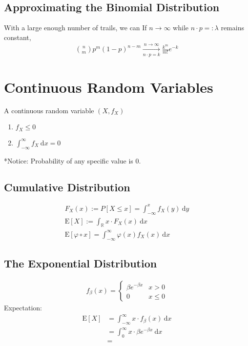 \documentclass[11pt,a4paper]{article}
\newcommand{\dd}{\mathrm{d}}
\newcommand{\dx}{\dd x}
\newcommand{\dy}{\dd y}
\begin{document}
\subsection{Approximating the Binomial Distribution}
With a large enough number of trails, we can
If $n\rightarrow\infty$ while $n\cdot p=:\lambda$ remains constant,
\begin{gather}
    \binom{n}{m}
    p^m(1-p)^{n-m}     \xrightarrow[n\cdot p =k]{n\rightarrow \infty} \frac{k^m}{m!}e^{-k}
\end{gather}

\section{Continuous Random Variables}
A continuous random variable $(X,f_X)$
\begin{enumerate}
    \item $f_X\le0$
    \item $\int_{-\infty}^{\infty}f_X\ \dx = 0$
\end{enumerate}
*Notice: Probability of any specific value is 0.
\subsection{Cumulative Distribution}
\begin{gather}
    F_X(x):=P[X\le x]=\int_{-\infty}^{x}f_X(y)\ \dy\\
    \mathrm{E}[X]:=\int_\mathbb{R}x\cdot F_X(x)\ \dx\\
    \mathrm{E}[\varphi \circ x] = \int^\infty_{-\infty}\varphi(x)f_X(x)\ \dx
\end{gather}

\subsection{The Exponential Distribution}
\begin{gather}
    f_\beta(x) = \begin{cases}
        \beta e^{-\beta x} & x>0   \\
        0                  & x\le0
    \end{cases}
\end{gather}
Expectation:
\begin{align*}
    \mathrm{E}[X] & = \int_{-\infty}^{\infty}x\cdot f_\beta(x)\ \dx   \\
                  & = \int_{0}^{\infty}x\cdot \beta e^{-\beta x}\ \dx \\
                  & =
\end{align*}
\end{document}
